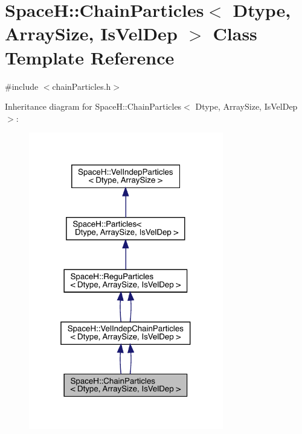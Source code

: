 \hypertarget{class_space_h_1_1_chain_particles}{}\section{SpaceH\+:\+:Chain\+Particles$<$ Dtype, Array\+Size, Is\+Vel\+Dep $>$ Class Template Reference}
\label{class_space_h_1_1_chain_particles}


{\ttfamily \#include $<$chain\+Particles.\+h$>$}



Inheritance diagram for SpaceH\+:\+:Chain\+Particles$<$ Dtype, Array\+Size, Is\+Vel\+Dep $>$\+:
\nopagebreak
\begin{figure}[H]
\begin{center}
\leavevmode
\includegraphics[width=241pt]{class_space_h_1_1_chain_particles__inherit__graph}
\end{center}
\end{figure}


